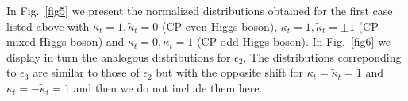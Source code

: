 \documentclass[aps,preprint,tightenlines,floatfix,superscriptaddress,nofootinbib,showpacs]{revtex4-1}
\def\kp{\kappa_t}
\def\kpt{\tilde{\kappa}_t}
\begin{document}
\par
%
In Fig.~\ref{fig5} we present the normalized distributions obtained
for the first case listed above with $\kp= 1,\kpt=0$
($\mathrm{CP}$-even Higgs boson), $\kp= 1,\kpt=\pm 1$
($\mathrm{CP}$-mixed Higgs boson) and $\kp= 0,\kpt=1$
($\mathrm{CP}$-odd Higgs boson). In Fig.~\ref{fig6} we display in turn
the analogous distributions for $\epsilon_2$. The distributions
correponding to $\epsilon_3$ are similar to those of $\epsilon_2$ but
with the opposite shift for $\kp=\kpt=1$ and $\kp=-\kpt=1$ and then we
do not include them here.
\begin{center}
\vspace*{1.4mm}
\begin{figure}[H]
\hspace*{-0.52cm}
\hspace*{-0.006\textwidth}
 \\

\end{figure}
\end{center}
\end{document}
